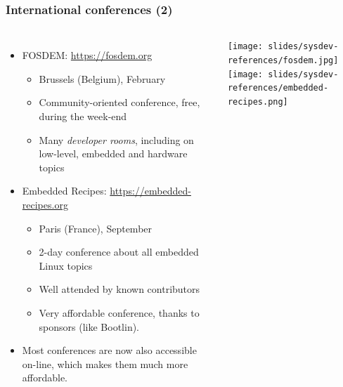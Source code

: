 \begin{frame}
  \frametitle{International conferences (2)}
  \begin{columns}
  \begin{itemize}
  \item FOSDEM: \url{https://fosdem.org}
    \begin{itemize}
    \item Brussels (Belgium), February
    \item Community-oriented conference, free, during the week-end
    \item Many {\em developer rooms}, including on low-level, embedded
      and hardware topics
    \end{itemize}
  \item Embedded Recipes: \url{https://embedded-recipes.org}
    \begin{itemize}
    \item Paris (France), September
    \item 2-day conference about all embedded Linux topics
    \item Well attended by known contributors
    \item Very affordable conference, thanks to sponsors (like Bootlin).
    \end{itemize}
  \item Most conferences are now also accessible on-line, which makes
    them much more affordable.
  \end{itemize}
    \begin{center}
      \texttt{[image: slides/sysdev-references/fosdem.jpg]}\\
      \vspace{1cm}
      \texttt{[image: slides/sysdev-references/embedded-recipes.png]}\\
    \end{center}
  \end{columns}
\end{frame}
